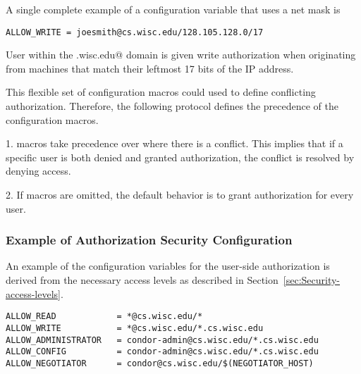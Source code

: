 A single complete example of a configuration variable that uses
a net mask is
\footnotesize
\begin{verbatim}
ALLOW_WRITE = joesmith@cs.wisc.edu/128.105.128.0/17
\end{verbatim}
\normalsize
User \verb@joesmith@ within the
\verb@cs.wisc.edu@ domain is given write authorization
when originating from machines that match their leftmost
17 bits of the IP address.

This flexible set of configuration macros could used to define
conflicting authorization.
Therefore, the following protocol defines the precedence of the
configuration macros.
\begin{description}
\item{1. } macros take precedence over 
where there is a conflict.
This implies that if a specific user is both denied and granted authorization,
the conflict is resolved by denying access.
\item{2. }If macros are omitted, the default behavior is to grant
authorization for every user.
\end{description}
\subsubsection{\label{sec:Security-sample2} Example of Authorization Security Configuration}

An example of the configuration variables for the user-side
authorization is derived from the necessary access levels
as described in
Section~\ref{sec:Security-access-levels}.

\footnotesize
\begin{verbatim}
ALLOW_READ            = *@cs.wisc.edu/*
ALLOW_WRITE           = *@cs.wisc.edu/*.cs.wisc.edu
ALLOW_ADMINISTRATOR   = condor-admin@cs.wisc.edu/*.cs.wisc.edu
ALLOW_CONFIG          = condor-admin@cs.wisc.edu/*.cs.wisc.edu
ALLOW_NEGOTIATOR      = condor@cs.wisc.edu/$(NEGOTIATOR_HOST)
\end{verbatim}
\normalsize

